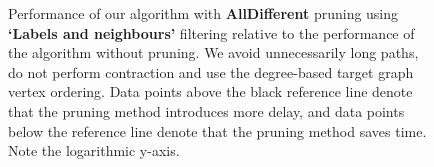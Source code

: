 \begin{figure}
\begin{subfigure} {0.5\linewidth}

\end{subfigure}

\caption{Performance of our algorithm with \textbf{AllDifferent} pruning using \textbf{`Labels and neighbours'} filtering relative to the performance of the algorithm without pruning. We avoid unnecessarily long paths, do not perform contraction and use the degree-based target graph vertex ordering. Data points above the black reference line denote that the pruning method introduces more delay, and data points below the reference line denote that the pruning method saves time. Note the logarithmic y-axis.}	
\label{fig:alldifferentlabelsneighbours}
\end{figure}

